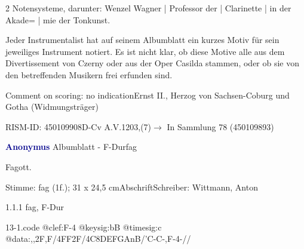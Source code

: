 \documentclass[a4paper, twocolumn, 11pt]{book}
\begin{document}
\newline %
\par 2 Notensysteme, darunter: Wenzel Wagner | Professor der | Clarinette | in der Akade= | mie der Tonkunst.
\par Jeder Instrumentalist hat auf seinem Albumblatt ein kurzes Motiv für sein jeweiliges Instrument notiert. Es ist nicht klar, ob diese Motive alle aus dem {\textquotedbl}Divertissement{\textquotedbl} von Czerny oder aus der Oper {\textquotedbl}Casilda{\textquotedbl} stammen, oder ob sie von den betreffenden Musikern frei erfunden sind.
\par Comment on scoring: no indication\newline Ernst II., Herzog von Sachsen-Coburg und Gotha  (Widmungsträger)
\par RISM-ID: 450109908\newline D-Cv  A.V.1203,(7)\newline $\rightarrow$ In Sammlung 78 (450109893)
      
\par \vspace{16pt} \textcolor{darkblue}{\textbf{Anonymus  }}\hfillplus{[13]}\newline Albumblatt - F-Dur\newline fag
\par \begin{itshape}[heading:] Fagott.\end{itshape} 
\par \textcolor{darkblue}{}  Stimme: fag  (1f.); 31 x 24,5 cm\newline Abschrift\newline Schreiber: Wittmann, Anton
\par 1.1.1  fag, F-Dur  
\begin{filecontents*}{13-1.code}
@clef:F-4
@keysig:bB
@timesig:c
@data:,,2F,F/4FF2F/4C{8DE}{FGAnB}/'C-C-,F-4-//
\end{filecontents*}
\end{document}
